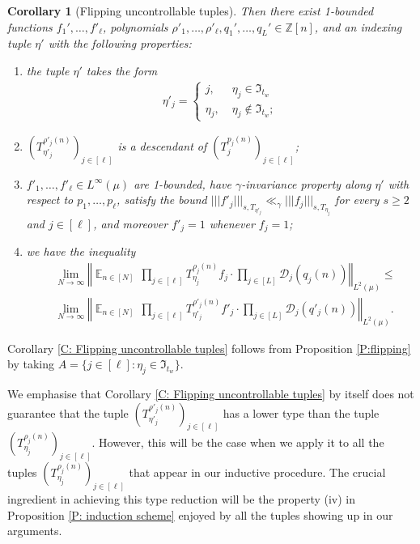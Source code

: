 \documentclass[11pt]{amsart}
\newtheorem{corollary}[lemma]{Corollary}
\theoremstyle{definition}
\newcommand{\Z}{{\mathbb Z}}
\newcommand{\CD}{{\mathcal D}}
\newcommand{\FI}{{\mathfrak I}}
\newcommand{\norm}[1]{\left\Vert #1\right\Vert}
\newcommand{\nnorm}[1]{\lvert\!|\!| #1|\!|\!\rvert}
\DeclareMathOperator*{\E}{\mathbb{E}}
\newcommand{\brac}[1]{\mathopen{}\left( #1 \mathclose{}\right)}
\begin{document}
\begin{corollary}[Flipping uncontrollable tuples]
Then there exist 1-bounded functions $f_1', \ldots, f'_{\ell}$, polynomials $\rho'_1, \ldots, \rho'_{\ell}, q_1', \ldots, q_L'\in\Z[n]$, and an indexing tuple $\eta'$ with the following properties:
\begin{enumerate}
    \item the tuple $\eta'$ takes the form
    \begin{align*}
        \eta'_j = \begin{cases} j,\; &\eta_j\in \FI_{t_w}\\ \eta_j,\; &\eta_j\notin \FI_{t_w};
        \end{cases}
    \end{align*}
    \item  $\brac{T_{\eta'_j}^{\rho'_j(n)}}_{j\in[\ell]}$ is a descendant of $\brac{T_j^{p_j(n)}}_{j\in[\ell]}$;
    \item $f'_1, \ldots, f'_{\ell}\in L^\infty(\mu)$ are 1-bounded, have $\gamma$-invariance property along $\eta'$ with respect to $p_1, \ldots, p_\ell$, satisfy the bound $\nnorm{f'_j}_{s, T_{\eta'_j}}\ll_\gamma \nnorm{f_j}_{s, T_{\eta_{j}}}$ for every $s\geq 2$ and $j\in[\ell]$, and moreover $f'_j = 1$ whenever $f_j = 1$;
    \item we have the inequality
    \begin{align*}%
    &\lim_{N\to\infty}\norm{\E_{n\in [N]} \,\prod_{j\in[\ell]}T_{{\eta_{j}}}^{\rho_{j}(n)}f_{j} \cdot \prod_{j\in[L]}\CD_{j}(q_{j}(n))}_{L^2(\mu)}\leq \\
    \nonumber
    & \lim_{N\to\infty}\norm{\E_{n\in [N]} \,\prod_{j\in[\ell]}T_{{\eta'_j}}^{\rho'_j(n)}f'_j \cdot\prod_{j\in[L]}\CD_{j}(q'_j(n))}_{L^2(\mu)}.
\end{align*}
\end{enumerate}
\end{corollary}
Corollary \ref{C: Flipping uncontrollable tuples} follows from Proposition \ref{P:flipping} by taking $A=\{j\in[\ell]: \eta_j\in \FI_{t_w}\}$.

We emphasise that Corollary \ref{C: Flipping uncontrollable tuples} by itself does not guarantee that the tuple $\brac{T_{\eta'_j}^{\rho'_j(n)}}_{j\in[\ell]}$ has a lower type than the tuple $\brac{T_{\eta_j}^{\rho_j(n)}}_{j\in[\ell]}$. However, this will be the case when we apply it to all the tuples $\brac{T_{\eta_j}^{\rho_j(n)}}_{j\in[\ell]}$ that appear in our inductive procedure. The crucial ingredient in achieving this type reduction will be the property (iv) in Proposition \ref{P: induction scheme} enjoyed by all the tuples showing up in our arguments.
\end{document}
